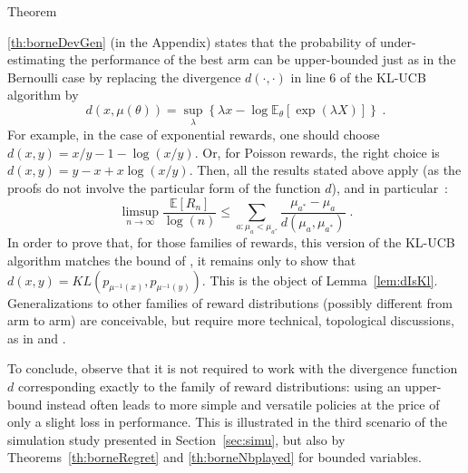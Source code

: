 \documentclass[wcp]{jmlr}
\newcommand{\E}{\mathbb{E}}
\newcommand{\1}{\mathbbm{1}}
\begin{document}
Theorem~{\ref{th:borneDevGen} (in the Appendix) states that the probability of under-estimating the performance of the best arm can be upper-bounded just as in the Bernoulli case by replacing the divergence $d(\cdot,\cdot)$ in line 6 of the KL-UCB algorithm by
\[ d(x, \mu(\theta)) = \sup_{\lambda} \left\{ \lambda x - \log \E_\theta\left[\exp(\lambda X)\right] \right\} \;.\]
For example, in the case of exponential rewards, one should choose $d(x,y) =x/y - 1 - \log (x/y)$. Or, for Poisson rewards, the right choice is $d(x,y)=y-x+x\log(x/y)$.
Then, all the results stated above apply (as the proofs do not involve the particular form of the function $d$), and in particular~:
  \[\limsup_{n\to\infty} \frac{\E[R_n]}{\log(n)} \leq \sum_{a:\mu_a<\mu_{a^*}}
  \frac{\mu_{a^*}-\mu_a}{d(\mu_a, \mu_{a^*})}\;.\]
In order to prove that, for those families of rewards, this version of the KL-UCB algorithm matches the bound of \cite{LaiRobbins85bandits} , it remains only to show that $d(x, y) = KL(p_{\mu^{-1}(x)}, p_{\mu^{-1}(y)})$. This is the object of
Lemma~\ref{lem:dIsKl}. 
Generalizations to other families of reward distributions (possibly different from arm to arm) are conceivable, but require more technical, topological discussions, as in \cite{BurnetasKatehakis97bandits} and \cite{HondaTakemura10DMED}.

To conclude, observe that it is not required to work with the divergence function $d$ corresponding exactly to the family of reward distributions: using an upper-bound instead often leads to more simple and versatile policies at the price of only a slight loss in performance. This is illustrated in the third scenario of the simulation study presented in Section~\ref{sec:simu}, but also by Theorems~\ref{th:borneRegret} and \ref{th:borneNbplayed} for bounded variables.

}
\end{document}

